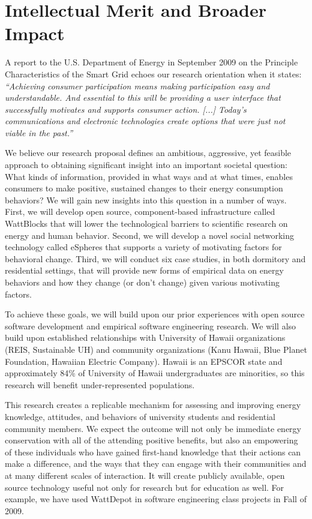 \section{Intellectual Merit and Broader Impact}
\label{sec:merit}

A report to the U.S. Department of Energy in September 2009 on the
Principle Characteristics of the Smart Grid echoes our research orientation
when it states: {\em ``Achieving consumer participation means
  making participation easy and understandable.  And essential to this will
  be providing a user interface that successfully motivates and supports
  consumer action. [...] Today's communications and electronic technologies
  create options that were just not viable in the past.''}
\cite{NETL:EnablesActiveParticipation}

We believe our research proposal defines an ambitious, aggressive, yet
feasible approach to obtaining significant insight into an important
societal question: What kinds of information, provided in what ways and at
what times, enables consumers to make positive, sustained changes to their
energy consumption behaviors?  We will gain new insights into this question
in a number of ways.  First, we will develop open source, component-based
infrastructure called WattBlocks that will lower the technological barriers
to scientific research on energy and human behavior.  Second, we will
develop a novel social networking technology called eSpheres that supports
a variety of motivating factors for behavioral change.  Third, we will
conduct six case studies, in both dormitory and residential settings, that
will provide new forms of empirical data on energy behaviors and how they
change (or don't change) given various motivating factors.

To achieve these goals, we will build upon our prior experiences with open
source software development and empirical software engineering research. We
will also build upon established relationships with University of Hawaii
organizations (REIS, Sustainable UH) and community organizations (Kanu
Hawaii, Blue Planet Foundation, Hawaiian Electric Company).  Hawaii
is an EPSCOR state and approximately 84\% of University of Hawaii
undergraduates are minorities, so this research will benefit
under-represented populations. 

This research creates a replicable mechanism for assessing and improving
energy knowledge, attitudes, and behaviors of university students and
residential community members. We expect the outcome will not only be
immediate energy conservation with all of the attending positive benefits,
but also an empowering of these individuals who have gained first-hand
knowledge that their actions can make a difference, and the ways that they
can engage with their communities and at many different scales of
interaction.  It will create publicly available, open source technology
useful not only for research but for education as well.  For example, we
have used WattDepot in software engineering class projects in Fall of 2009.

